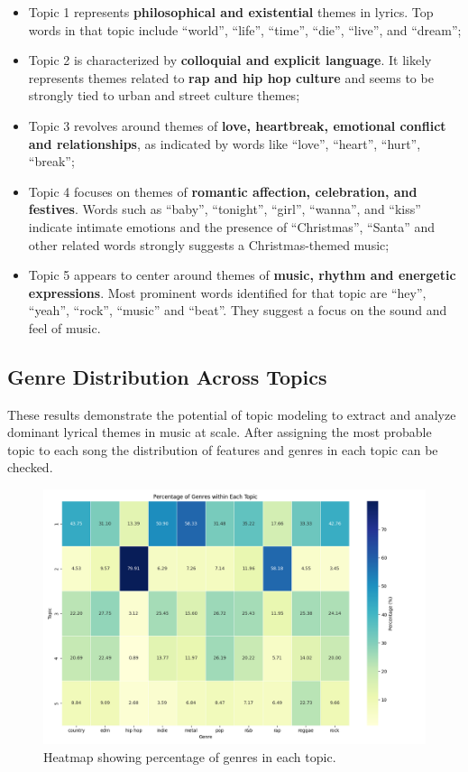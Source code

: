 \begin{itemize}
     \item Topic 1 represents \textbf{philosophical and existential} themes in lyrics.
      Top words in that topic include ``world'', ``life'', ``time'', ``die'',
      ``live'', and ``dream'';
    \item Topic 2 is characterized by \textbf{colloquial and explicit
      language}. It likely represents themes related to \textbf{rap and hip hop culture}
      and seems to be strongly tied to urban and street culture themes;
    \item Topic 3 revolves around themes of \textbf{love, heartbreak, emotional
      conflict and relationships}, as indicated by words like ``love'',
      ``heart'', ``hurt'', ``break'';
    \item Topic 4 focuses on themes of \textbf{romantic affection, celebration,
      and festives}. Words such as ``baby'', ``tonight'', ``girl'', ``wanna'',
      and ``kiss'' indicate intimate emotions and the presence of
      ``Christmas'', ``Santa'' and other related words strongly suggests a
      Christmas-themed music;
    \item Topic 5 appears to center around themes of \textbf{music, rhythm and
      energetic expressions}. Most prominent words identified for that topic
      are ``hey'', ``yeah'', ``rock'', ``music'' and ``beat''. They suggest a
      focus on the sound and feel of music. 
\end{itemize}


\subsection{Genre Distribution Across Topics}
These results demonstrate the potential of topic modeling to extract and
analyze dominant lyrical themes in music at scale. After assigning the most
probable topic to each song the distribution of features and genres in each
topic can be checked.


\begin{center}
\begin{figure}[H]
  \centering
  \includegraphics[width=6in]{img/lda_genres_distribution.png}
  \caption{Heatmap showing percentage of genres in each topic.}
  \label{Figure:lda_genres_distribution}
\end{figure}
\end{center}

